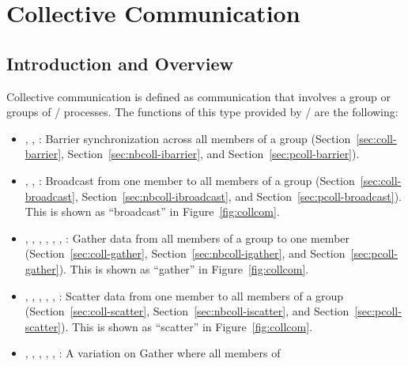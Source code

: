 \chapter{Collective Communication}
\label{sec:coll}
\label{chap:coll}
\label{chap:collective-2}

\section{Introduction and Overview}
\label{sec:coll-intro}

Collective communication is defined as communication that involves
a group
or groups
of \MPI/ processes.
The functions of this type provided by \MPI/ are the following:
\begin{itemize}
\item
{}, , :
Barrier synchronization across
all members of a group
(Section~\ref{sec:coll-barrier}, Section~\ref{sec:nbcoll-ibarrier}, and Section~\ref{sec:pcoll-barrier}).
\item
{}, , :
Broadcast from one member to all members of a group
(Section~\ref{sec:coll-broadcast}, Section~\ref{sec:nbcoll-ibroadcast}, and Section~\ref{sec:pcoll-broadcast}).
This is shown
as ``broadcast''
in Figure~\ref{fig:collcom}.
\item
{}, , ,
, , ,
:
Gather data from
all members of a group
to one member
(Section~\ref{sec:coll-gather}, Section~\ref{sec:nbcoll-igather}, and Section~\ref{sec:pcoll-gather}).
This is shown
as ``gather''
in Figure~\ref{fig:collcom}.
\item
{}, , ,
, , :
Scatter data from one member to all members of a group
(Section~\ref{sec:coll-scatter}, Section~\ref{sec:nbcoll-iscatter}, and Section~\ref{sec:pcoll-scatter}).
This is shown
as ``scatter''
in Figure~\ref{fig:collcom}.
\item
{}, , ,
, , :
A variation on Gather where all members of

\end{itemize}

